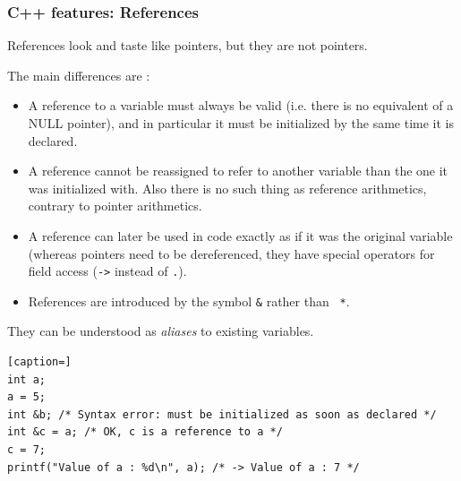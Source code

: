 \documentclass[8pt]{beamer}
\begin{document}
\begin{frame}[containsverbatim]
\frametitle{C++ features: References}

References look and taste like pointers, but they are not pointers.

\medskip

The main differences are :

\begin{itemize}
	\item A reference to a variable must always be valid (i.e.
		there is no equivalent of a NULL pointer), and in
		particular it must be initialized by the same time it is
		declared.
	\item A reference cannot be reassigned to refer to another variable than
		the one it was initialized with. Also there is no such thing as
		reference arithmetics, contrary to pointer arithmetics.
	\item A reference can later be used in code exactly as if it was the
		original variable (whereas pointers need to be dereferenced, 
		they have special operators for field access ({\tt ->} instead
		of {\tt .}).
	\item References are introduced by the symbol {\tt \&} rather than {\tt
		*}.
\end{itemize}

They can be understood as {\it aliases} to existing variables.\\[3pt]

\begin{lstlisting}[caption=]
int a;
a = 5;
int &b; /* Syntax error: must be initialized as soon as declared */
int &c = a; /* OK, c is a reference to a */
c = 7;
printf("Value of a : %d\n", a); /* -> Value of a : 7 */
\end{lstlisting}
\end{frame}
\end{document}

